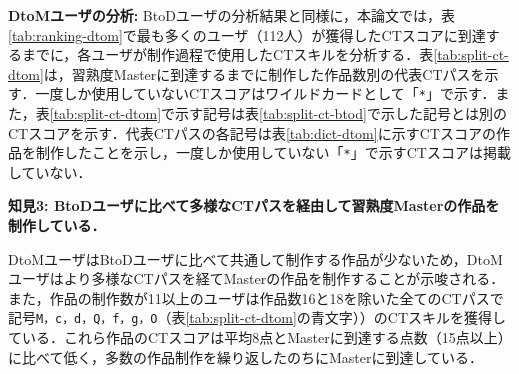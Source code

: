\documentclass[submit]{ipsj}
\begin{document}
\noindent\textbf{DtoMユーザの分析: }BtoDユーザの分析結果と同様に，本論文では，表\ref{tab:ranking-dtom}で最も多くのユーザ（112人）が獲得したCTスコアに到達するまでに，各ユーザが制作過程で使用したCTスキルを分析する．表\ref{tab:split-ct-dtom}は，習熟度Masterに到達するまでに制作した作品数別の代表CTパスを示す．一度しか使用していないCTスコアはワイルドカードとして「\texttt{\large{*}}」で示す．また，表\ref{tab:split-ct-dtom}で示す記号は表\ref{tab:split-ct-btod}で示した記号とは別のCTスコアを示す．代表CTパスの各記号は表\ref{tab:dict-dtom}に示すCTスコアの作品を制作したことを示し，一度しか使用していない「\texttt{\large{*}}」で示すCTスコアは掲載していない．


\noindent\textbf{知見3: BtoDユーザに比べて多様なCTパスを経由して習熟度Masterの作品を制作している．}

DtoMユーザはBtoDユーザに比べて共通して制作する作品が少ないため，DtoMユーザはより多様なCTパスを経てMasterの作品を制作することが示唆される．
また，作品の制作数が11以上のユーザは作品数16と18を除いた全てのCTパスで記号\texttt{\large{M，c，d，Q，f，g，O}}（表\ref{tab:split-ct-dtom}の青文字））のCTスキルを獲得している．これら作品のCTスコアは平均8点とMasterに到達する点数（15点以上）に比べて低く，多数の作品制作を繰り返したのちにMasterに到達している．

\end{document}
